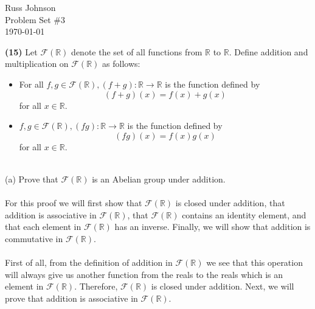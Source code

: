 \documentclass[11pt,a4paper]{article}
\begin{document}
\begin{flushright}
Russ Johnson\\
Problem Set $\#3$\\
\today\\
\end{flushright}

{\bf (15)} Let $\mathcal{F}(\mathbb{R})$ denote the set of all functions from $\mathbb{R}$ to $\mathbb{R}$. Define addition and multiplication on $\mathcal{F}(\mathbb{R})$ as follows:
\begin{itemize}
\item For all $f,g \in \mathcal{F}(\mathbb{R}), (f + g) :\mathbb{R} \rightarrow \mathbb{R}$ is the function defined by
\[(f+g)(x) = f(x)+g(x)\]
for all $x\in\mathbb{R}$.
\item $f,g \in \mathcal{F}(\mathbb{R}), (fg) :\mathbb{R} \rightarrow \mathbb{R}$ is the function defined by
\[(fg)(x) = f(x)g(x)\]
for all $x\in\mathbb{R}$.
\end{itemize}
~\\
(a) Prove that $\mathcal{F}(\mathbb{R})$ is an Abelian group under addition.\\
~\\
For this proof we will first show that $\mathcal{F}(\mathbb{R})$ is closed under addition, that addition is associative in $\mathcal{F}(\mathbb{R})$, that $\mathcal{F}(\mathbb{R})$ contains an identity element, and that each element in $\mathcal{F}(\mathbb{R})$ has an inverse. Finally, we will show that addition is commutative in $\mathcal{F}(\mathbb{R})$.\\
~\\
First of all, from the definition of addition in $\mathcal{F}(\mathbb{R})$ we see that this operation will always give us another function from the reals to the reals which is an element in $\mathcal{F}(\mathbb{R})$. Therefore, $\mathcal{F}(\mathbb{R})$ is closed under addition. Next, we will prove that  addition is associative in $\mathcal{F}(\mathbb{R})$.
\end{document}
